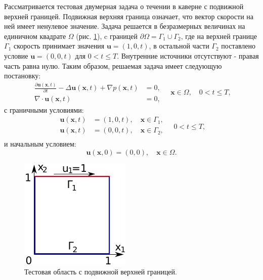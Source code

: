 \documentclass[12pt]{article}
\begin{document}
Рассматривается тестовая двумерная задача о течении в каверне с подвижной верхней границей. Подвижная верхняя граница означает, что вектор скорости на ней имеет ненулевое значение. Задача решается в безразмерных величинах на единичном квадрате $\Omega$ (рис. \ref{fg:cavity}), c границей $\partial \Omega=\Gamma_1 \cup \Gamma_2$, где на верхней границе $\Gamma_1$ скорость принимает значения ${\bm u}=(1, 0, t)$, в остальной части $\Gamma_2$ поставлено условие ${\bm u}=(0, 0, t)$ для $0<t \leq T$. Внутренние источники отсутствуют - правая часть равна нулю. Таким образом, решаемая задача имеет следующую постановку:
\begin{equation}
\begin{split}
\frac{\partial {\bm u}({\bm x}, t)}{\partial t} -\Delta {\bm u}({\bm x}, t) + \nabla p({\bm x}, t) &= 0, \\
\nabla\cdot{\bm u}({\bm x}, t) &= 0, 
\end{split}
\quad {\bm x} \in \Omega, \quad 0<t \leq T,
\label{eq:scheme-main}
\end{equation} 
с граничными условиями:
\begin{equation}
\begin{split}
{\bm u(\bm x, t)} &= (1, 0, t), \quad {\bm x} \in \Gamma_1,  \\
{\bm u(\bm x, t)} &= (0, 0, t), \quad {\bm x} \in \Gamma_2, \\
\end{split}
\quad 0<t \leq T,
\label{eq:scheme-boundary}
\end{equation} 
и начальным условием:
\begin{equation}
{\bm u(\bm x, 0)} = (0, 0), \quad {\bm x} \in \Omega.
\label{eq:scheme-start}
\end{equation}

\begin{figure}
	\begin{center}
		\includegraphics[width=200px]{pics/cavity400}
		\caption{Тестовая область с подвижной верхней границей.}
		\label{fg:cavity}
	\end{center}
\end{figure}
\end{document}
